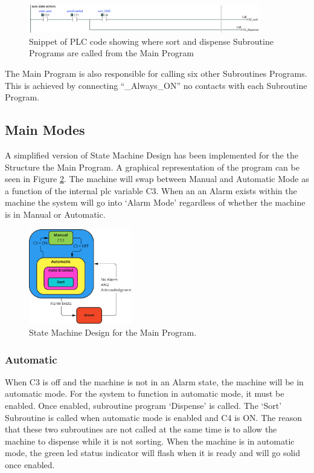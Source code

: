         \begin{figure}[H]
            \centering
            \includegraphics[width = 0.9\textwidth]{2_images/plcMainAuto}
            \caption{Snippet of PLC code showing where sort and dispense Subroutine Programs are called from the Main Program}
            \label{fig:plcMainAuto}
        \end{figure}
    The Main Program is also responsible for calling six other Subroutines Programs. This is achieved by connecting   ``\_Always\_ON'' \acrshort{no} contacts with each Subroutine Program.
    
    \subsection{Main Modes}
    A simplified version of State Machine Design has been implemented for the the Structure the Main Program. A graphical representation of the program can be seen in Figure \ref{fig:mainStateMachine}. The machine will swap between Manual and Automatic Mode as a function of the internal \acrshort{plc} variable C3. When an an Alarm exists within the machine the system will go into `Alarm Mode' regardless of whether the machine is in Manual or Automatic. 
    
        \begin{figure}[H]
            \centering
            \includegraphics[width = 0.4\textwidth]{2_images/mainStateMachine}
            \caption{State Machine Design for the Main Program.}
            \label{fig:mainStateMachine}
        \end{figure}
    
        \subsubsection{Automatic}
            When C3 is off and the machine is not in an Alarm state, the machine will be in automatic mode. For the system to function in automatic mode, it must be enabled.  Once enabled, subroutine program `Dispense' is called. The `Sort' Subroutine is called when automatic mode is enabled and C4 is ON. The reason that these two subroutines are not called at the same time is to allow the machine to dispense while it is not sorting. 
            When the machine is in automatic mode, the green \acrshort{led} status indicator will flash when it is ready and will go solid once enabled.

